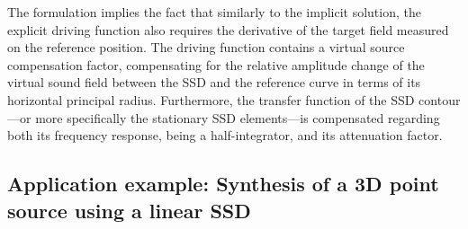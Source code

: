 The formulation implies the fact that similarly to the implicit solution, the explicit driving function also requires the derivative of the target field measured on the reference position.
The driving function contains a virtual source compensation factor, compensating for the relative amplitude change of the virtual sound field between the SSD and the reference curve in terms of its horizontal principal radius.
Furthermore, the transfer function of the SSD contour---or more specifically the stationary SSD elements---is compensated regarding both its frequency response, being a half-integrator, and its attenuation factor.

\subsection*{Application example: Synthesis of a 3D point source using a linear SSD}

